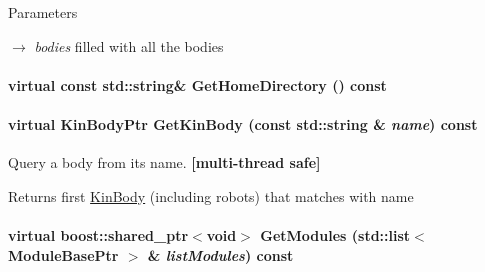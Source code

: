 \begin{DoxyParams}{Parameters}
\item[\mbox{$\rightarrow$} {\em bodies}]filled with all the bodies \end{DoxyParams}
\hypertarget{classOpenRAVE_1_1EnvironmentBase_abb0d60e241f34412cb0e002ddbbbdb50}{
\paragraph[{GetHomeDirectory}]{\setlength{\rightskip}{0pt plus 5cm}virtual const std::string\& GetHomeDirectory () const}\hfill}
\label{classOpenRAVE_1_1EnvironmentBase_abb0d60e241f34412cb0e002ddbbbdb50}
\hypertarget{classOpenRAVE_1_1EnvironmentBase_ad56e81b8f92ad253a7a15bfc3e022e9d}{
\paragraph[{GetKinBody}]{\setlength{\rightskip}{0pt plus 5cm}virtual KinBodyPtr GetKinBody (const std::string \& {\em name}) const}\hfill}
\label{classOpenRAVE_1_1EnvironmentBase_ad56e81b8f92ad253a7a15bfc3e022e9d}


Query a body from its name. {\bfseries \mbox{[}multi-\/thread safe\mbox{]}} 

\begin{DoxyReturn}{Returns}
first \hyperlink{classOpenRAVE_1_1KinBody}{KinBody} (including robots) that matches with name 
\end{DoxyReturn}
\hypertarget{classOpenRAVE_1_1EnvironmentBase_ac571ddc6ccffc3b7cb3bf345f8d29b78}{
\paragraph[{GetModules}]{\setlength{\rightskip}{0pt plus 5cm}virtual boost::shared\_\-ptr$<$void$>$ GetModules (std::list$<$ ModuleBasePtr $>$ \& {\em listModules}) const}\hfill}
\label{classOpenRAVE_1_1EnvironmentBase_ac571ddc6ccffc3b7cb3bf345f8d29b78}


